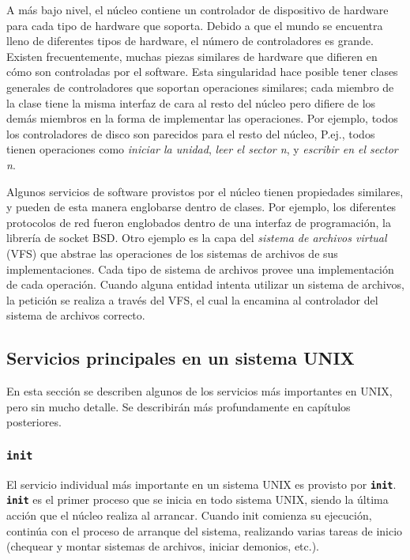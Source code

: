 \documentclass[12pt]{article}
\begin{document}
\begin{}
A más bajo nivel, el núcleo contiene un controlador de dispositivo de
hardware para cada tipo de hardware que soporta. Debido a que el mundo se
encuentra lleno de diferentes tipos de hardware, el número de controladores es
grande. Existen frecuentemente, muchas piezas similares de hardware que difieren
en cómo son controladas por el software. Esta singularidad hace posible tener
clases generales de controladores que soportan operaciones similares; cada
miembro de la clase tiene la misma interfaz de cara al resto del núcleo pero
difiere de los demás miembros en la forma de implementar las operaciones. Por
ejemplo, todos los controladores de disco son parecidos para el resto del
núcleo, P.ej., todos tienen operaciones como \textit{iniciar la unidad}, 
\textit{leer el sector n}, y \textit{escribir en el sector n}.

 Algunos servicios de software provistos por el núcleo tienen propiedades
similares, y pueden de esta manera englobarse dentro de clases. Por ejemplo, los
diferentes protocolos de red fueron englobados dentro de una interfaz de
programación, la librería de socket BSD. Otro ejemplo es la capa del
\textit{sistema de archivos virtual} (VFS) que abstrae las
operaciones de los sistemas de archivos de sus implementaciones. Cada tipo de
sistema de archivos provee una implementación de cada operación. Cuando alguna
entidad intenta utilizar un sistema de archivos, la petición se realiza a través
del VFS, el cual la encamina al controlador del sistema de archivos correcto.




\subsection{Servicios principales en un sistema UNIX}

 En esta sección se describen algunos de los servicios más importantes en
UNIX, pero sin mucho detalle. Se describirán más profundamente en capítulos
posteriores.  


\subsubsection{\texttt{\textbf{init}}}

 El servicio individual más importante en un sistema UNIX es provisto por
\texttt{\textbf{init}}. \texttt{\textbf{init}} es el primer proceso que se
inicia en todo sistema UNIX, siendo la última acción que el núcleo realiza al
arrancar.  Cuando init comienza su ejecución, continúa con el proceso de
arranque del sistema, realizando varias tareas de inicio (chequear y montar
sistemas de archivos, iniciar demonios, etc.).  


\end{}
\end{document}
